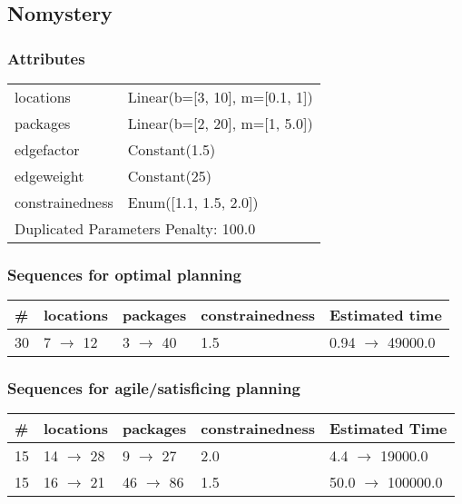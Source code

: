 \documentclass{article}
\begin{document}
                            \newpage \subsection{Nomystery}
                    \subsubsection*{Attributes}
                    \begin{tabular}{@{}p{}p{}@{}}
                    \toprule
                    locations & Linear(b=[3, 10], m=[0.1, 1])\\
packages & Linear(b=[2, 20], m=[1, 5.0])\\
edgefactor & Constant(1.5)\\
edgeweight & Constant(25)\\
constrainedness & Enum([1.1, 1.5, 2.0]) \\
                    \bottomrule
                    \multicolumn{2}{l}{Duplicated Parameters Penalty: 100.0}
                    \end{tabular}
                
                            \subsubsection*{Sequences for optimal planning}

                            \begin{center}
                            \begin{tabular}{@{}l|l|l|l|l@{}}
                            \# & locations & packages & constrainedness & Estimated time\\\midrule
                            30&7 $\rightarrow$ 12&3 $\rightarrow$ 40&1.5&0.94 $\rightarrow$ 49000.0
                            \end{tabular}
                            \end{center}
                    
                         \subsubsection*{Sequences for agile/satisficing planning}

                        \begin{center}
                        \begin{tabular}{@{}l|l|l|l|l@{}}
                        \# & locations & packages & constrainedness & Estimated Time\\\midrule
                        15&14 $\rightarrow$ 28&9 $\rightarrow$ 27&2.0&4.4 $\rightarrow$ 19000.0\\
15&16 $\rightarrow$ 21&46 $\rightarrow$ 86&1.5&50.0 $\rightarrow$ 100000.0
                        \end{tabular}
                        \end{center}
                    
\end{document}
